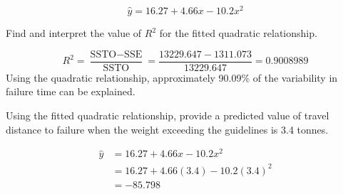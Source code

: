 \documentclass{examsetup}\usepackage[]{graphicx}\usepackage[]{color}
\begin{document}
\begin{questions}
\begin{parts}
\begin{subparts}
\begin{solution}
         $$\hat{y} = 16.27 + 4.66 x - 10.2 x^2$$
      \end{solution} 
      \subpart[5] Find and interpret the value of $R^2$ for the fitted quadratic relationship.
      \begin{solution}
         $$
         R^2 = \frac{\text{SSTO} - \text{SSE}}{\text{SSTO}} = \frac{13229.647 - 1311.073}{13229.647} = 0.9008989
         $$
         Using the quadratic relationship, approximately 90.09\% of the variability in failure time can be explained.
      \end{solution}
      \subpart[5] Using the fitted quadratic relationship, provide a predicted value of travel distance to failure when the weight exceeding the guidelines is 3.4 tonnes.
      \begin{solution}
         \begin{align*}
         \hat{y} &= 16.27 + 4.66 x - 10.2 x^2 \\
                 &= 16.27 + 4.66 (3.4) - 10.2 (3.4)^2 \\
                 &= \ensuremath{-85.798} \\
         \end{align*}
      \end{solution}
   \end{subparts}
\end{parts}

\end{questions}
\end{document}
